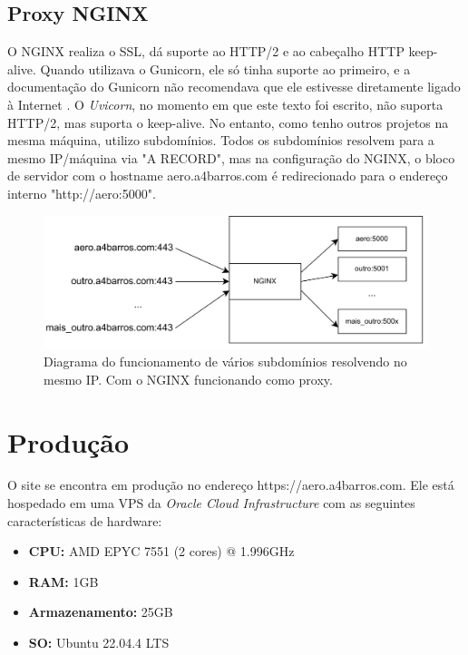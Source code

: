 

\subsection{Proxy NGINX}
O NGINX realiza o SSL, dá suporte ao HTTP/2 e ao cabeçalho HTTP keep-alive. Quando
utilizava o Gunicorn, ele só tinha suporte ao primeiro, e a documentação do Gunicorn não
recomendava que ele estivesse diretamente ligado à Internet \cite{nginx-gunicorn}. O \textit{Uvicorn},
no momento em que este texto foi escrito, não suporta HTTP/2, mas suporta o keep-alive. No
entanto, como tenho outros projetos na mesma máquina, utilizo subdomínios. Todos os subdomínios
resolvem para a mesmo IP/máquina via "A RECORD", mas na configuração
do NGINX, o bloco de servidor com o hostname aero.a4barros.com é redirecionado para o
endereço interno "http://aero:5000".



\begin{figure}[ht]
    \begin{center}
    \includegraphics[width=400pt]{img/arquit.png}
    \caption{Diagrama do funcionamento de vários subdomínios resolvendo no mesmo IP. Com o NGINX funcionando como proxy.}
    \label{fig:sbrf-plot}
    \end{center}
\end{figure}

\section{Produção}
O site se encontra em produção no endereço https://aero.a4barros.com. Ele está hospedado em uma VPS
da \textit{Oracle Cloud Infrastructure} com as seguintes características de hardware:

\begin{itemize}
    \item \textbf{CPU:} AMD EPYC 7551 (2 cores) @ 1.996GHz
    \item \textbf{RAM:} 1GB
    \item \textbf{Armazenamento:} 25GB
    \item \textbf{SO:} Ubuntu 22.04.4 LTS
\end{itemize}

